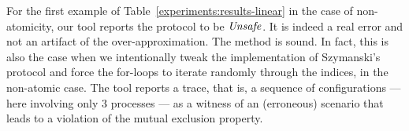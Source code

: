 \begin{wraptable}{r}[0pt]{0.63\textwidth}
\begin{tabular}{|l||c||c|c|c|}
\end{tabular}
\vspace{-20pt}
\end{wraptable}
%
For the first example of Table~\ref{experiments:results-linear} in the
case of non-atomicity, our tool reports the protocol to be
$\mathit{Unsafe}$. It is indeed a real error and not an artifact of the
over-approximation. The method is sound.
%
In fact, this is also the case when we intentionally tweak the
implementation of Szymanski's protocol and force the for-loops to
iterate randomly through the indices, in the non-atomic case. %
The tool reports a trace, that is, a sequence of configurations ---
here involving only 3 processes --- as a witness of an (erroneous)
scenario that leads to a violation of the mutual exclusion property.

